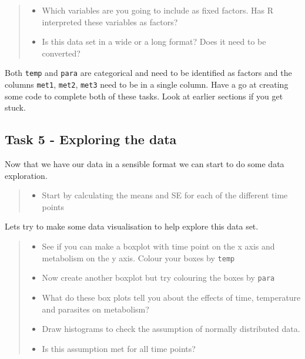 \documentclass[
]{book}
\providecommand{\tightlist}{%
  \setlength{\itemsep}{0pt}\setlength{\parskip}{0pt}}
\begin{document}
\begin{quote}
\begin{itemize}
\tightlist
\item
  Which variables are you going to include as fixed factors. Has R interpreted these variables as factors?
\item
  Is this data set in a wide or a long format? Does it need to be converted?
\end{itemize}
\end{quote}

Both \texttt{temp} and \texttt{para} are categorical and need to be identified as factors and the columns \texttt{met1}, \texttt{met2}, \texttt{met3} need to be in a single column. Have a go at creating some code to complete both of these tasks. Look at earlier sections if you get stuck.

\hypertarget{task-5---exploring-the-data}{%
\subsection{Task 5 - Exploring the data}\label{task-5---exploring-the-data}}

Now that we have our data in a sensible format we can start to do some data exploration.

\begin{quote}
\begin{itemize}
\tightlist
\item
  Start by calculating the means and SE for each of the different time points
\end{itemize}
\end{quote}

Lets try to make some data visualisation to help explore this data set.

\begin{quote}
\begin{itemize}
\tightlist
\item
  See if you can make a boxplot with time point on the x axis and metabolism on the y axis. Colour your boxes by \texttt{temp}
\item
  Now create another boxplot but try colouring the boxes by \texttt{para}
\item
  What do these box plots tell you about the effects of time, temperature and parasites on metabolism?
\item
  Draw histograms to check the assumption of normally distributed data.
\item
  Is this assumption met for all time points?
\end{itemize}
\end{quote}
\end{document}

